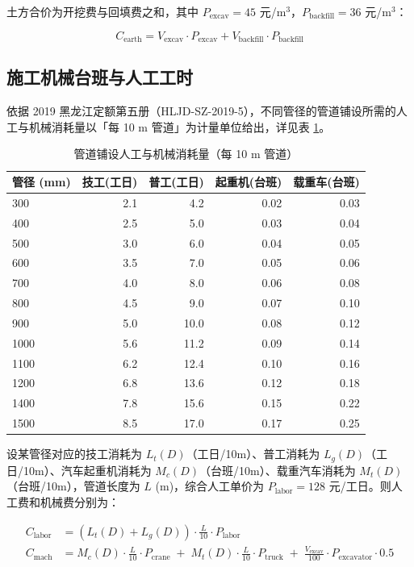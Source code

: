 \documentclass[12pt,a4paper]{ctexart}
\begin{document}
土方合价为开挖费与回填费之和，其中 $P_{\text{excav}} = 45$ 元/m$^3$，$P_{\text{backfill}} = 36$ 元/m$^3$：

\begin{equation}
C_{\text{earth}} = V_{\text{excav}} \cdot P_{\text{excav}} + V_{\text{backfill}} \cdot P_{\text{backfill}}
\end{equation}

\subsection{施工机械台班与人工工时}

依据 2019 黑龙江定额第五册（HLJD-SZ-2019-5），不同管径的管道铺设所需的人工与机械消耗量以「每 10 m 管道」为计量单位给出，详见表 \ref{tab:machine_shift_full}。

\begin{table}[htbp]
\centering
\caption{管道铺设人工与机械消耗量（每 10 m 管道）}
\label{tab:machine_shift_full}
\small
\begin{tabular}{lrrrr}
\toprule
\textbf{管径 (mm)} & \textbf{技工(工日)} & \textbf{普工(工日)} & \textbf{起重机(台班)} & \textbf{载重车(台班)} \\
\midrule
300  & 2.1 & 4.2 & 0.02 & 0.03 \\
400  & 2.5 & 5.0 & 0.03 & 0.04 \\
500  & 3.0 & 6.0 & 0.04 & 0.05 \\
600  & 3.5 & 7.0 & 0.05 & 0.06 \\
700  & 4.0 & 8.0 & 0.06 & 0.08 \\
800  & 4.5 & 9.0 & 0.07 & 0.10 \\
900  & 5.0 & 10.0& 0.08 & 0.12 \\
1000 & 5.6 & 11.2& 0.09 & 0.14 \\
1100 & 6.2 & 12.4& 0.10 & 0.16 \\
1200 & 6.8 & 13.6& 0.12 & 0.18 \\
1400 & 7.8 & 15.6& 0.15 & 0.22 \\
1500 & 8.5 & 17.0& 0.17 & 0.25 \\
\bottomrule
\end{tabular}
\end{table}

设某管径对应的技工消耗为 $L_t(D)$（工日/10m）、普工消耗为 $L_g(D)$（工日/10m）、汽车起重机消耗为 $M_c(D)$（台班/10m）、载重汽车消耗为 $M_t(D)$（台班/10m），管道长度为 $L$ (m)，综合人工单价为 $P_{\text{labor}} = 128$ 元/工日。则人工费和机械费分别为：

\begin{align}
C_{\text{labor}} &= \left(L_t(D) + L_g(D)\right) \cdot \frac{L}{10} \cdot P_{\text{labor}} \\
C_{\text{mach}} &= M_c(D) \cdot \frac{L}{10} \cdot P_{\text{crane}} \;+\; M_t(D) \cdot \frac{L}{10} \cdot P_{\text{truck}} \;+\; \frac{V_{\text{excav}}}{100} \cdot P_{\text{excavator}} \cdot 0.5
\end{align}
\end{document}
